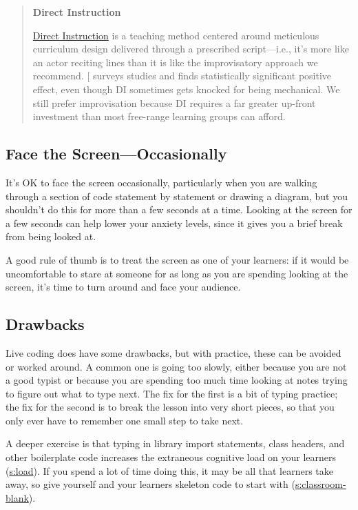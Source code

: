 \begin{quote}\setlength{\parindent}{0pt}
\textbf{Direct Instruction}

\protect\hyperlink{g:direct-instruction}{Direct Instruction} is a teaching
method centered around meticulous curriculum design delivered through
a prescribed script---i.e., it's more like an actor reciting lines than
it is like the improvisatory approach we recommend. {[}\protect[\hyperlink{b:Stoc2018}{Stoc2018}]{]}
surveys studies and finds statistically significant positive effect,
even though DI sometimes gets knocked for being mechanical. We still
prefer improvisation because DI requires a far greater up-front
investment than most free-range learning groups can afford.
\end{quote}

\subsection{Face the Screen---Occasionally}\label{face-the-screenoccasionally}

It's OK to face the screen occasionally, particularly when you are
walking through a section of code statement by statement or drawing a
diagram, but you shouldn't do this for more than a few seconds at a
time. Looking at the screen for a few seconds can help lower your
anxiety levels, since it gives you a brief break from being looked at.

A good rule of thumb is to treat the screen as one of your learners: if
it would be uncomfortable to stare at someone for as long as you are
spending looking at the screen, it's time to turn around and face your
audience.

\subsection{Drawbacks}\label{drawbacks}

Live coding does have some drawbacks, but with practice, these can be
avoided or worked around. A common one is going too slowly, either
because you are not a good typist or because you are spending too much
time looking at notes trying to figure out what to type next. The fix
for the first is a bit of typing practice; the fix for the second is to
break the lesson into very short pieces, so that you only ever have to
remember one small step to take next.

A deeper exercise is that typing in library import statements, class
headers, and other boilerplate code increases the extraneous cognitive
load on your learners (\protect\hyperlink{CHAPTER}{s:load}). If you spend a lot of time
doing this, it may be all that learners take away, so give yourself and
your learners skeleton code to start with
(\protect\hyperlink{SECTION}{s:classroom-blank}).

